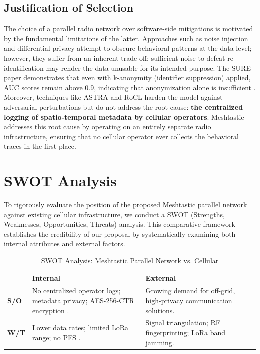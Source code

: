 \subsection{Justification of Selection}
The choice of a parallel radio network over software-side mitigations is motivated by the fundamental limitations of the latter. Approaches such as noise injection and differential privacy attempt to obscure behavioral patterns at the data level; however, they suffer from an inherent trade-off: sufficient noise to defeat re-identification may render the data unusable for its intended purpose. The SURE paper demonstrates that even with k-anonymity (identifier suppression) applied, AUC scores remain above 0.9, indicating that anonymization alone is insufficient \cite{duan2025sure}. Moreover, techniques like ASTRA \cite{chhipa2025astra} and RoCL \cite{kim2020rocl} harden the model against adversarial perturbations but do not address the root cause: \textbf{the centralized logging of spatio-temporal metadata by cellular operators}. Meshtastic addresses this root cause by operating on an entirely separate radio infrastructure, ensuring that no cellular operator ever collects the behavioral traces in the first place.

\section{SWOT Analysis}\label{sec:swot}

To rigorously evaluate the position of the proposed Meshtastic parallel network against existing cellular infrastructure, we conduct a SWOT (Strengths, Weaknesses, Opportunities, Threats) analysis. This comparative framework establishes the credibility of our proposal by systematically examining both internal attributes and external factors.

\begin{table}[htbp]
\caption{SWOT Analysis: Meshtastic Parallel Network vs. Cellular}
\begin{center}
\small
\begin{tabular}{@{}lp{3cm}p{3cm}@{}}
\toprule
 & \textbf{Internal} & \textbf{External} \\
\midrule
\textbf{S/O} & No centralized operator logs; metadata privacy; AES-256-CTR encryption \cite{meshtastic_overview}. & Growing demand for off-grid, high-privacy communication solutions. \\
\midrule
\textbf{W/T} & Lower data rates; limited LoRa range; no PFS \cite{meshtastic_overview}. & Signal triangulation; RF fingerprinting; LoRa band jamming. \\
\bottomrule
\end{tabular}
\end{center}
\end{table}

